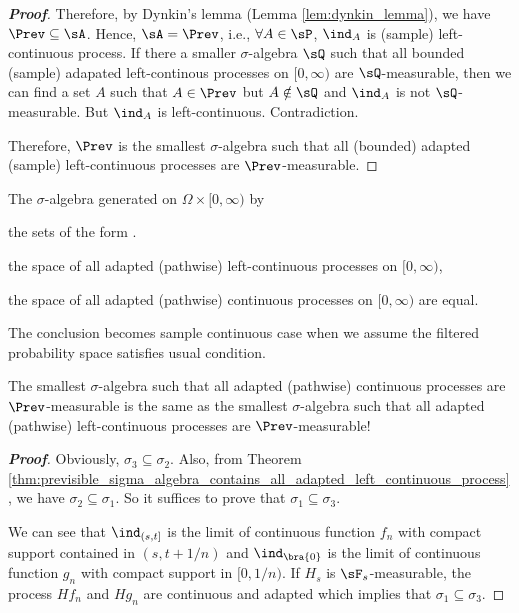 \begin{proof}[\bf Proof]
Therefore, by Dynkin's lemma (Lemma \ref{lem:dynkin_lemma}), we have $\Prev \subseteq \sA$. Hence, $\sA = \Prev$, i.e., $\forall A\in \sP$, $\ind_A$ is (sample) left-continuous process. If there a smaller $\sigma$-algebra $\sQ$ such that all bounded (sample) adapated left-continous processes on $[0,\infty)$ are $\sQ$-measurable, then we can find a set $A$ such that $A\in \Prev$ but $A\notin \sQ$ and $\ind_A$ is not $\sQ$-measurable. But $\ind_A$ is left-continuous. Contradiction.

Therefore, $\Prev$ is the smallest $\sigma$-algebra such that all (bounded) adapted (sample) left-continuous processes are $\Prev$-measurable.
\end{proof}


\begin{proposition}\label{pro:sigma_algebra_simple_process_left_continuous_continuous_equal}
The $\sigma$-algebra generated on $\Omega \times [0,\infty)$ by
\ben
\item [(i)] the sets of the form
\be
\bra{E \times(s, t]: E \in \sF_s,s < t} \cup {}.
\ee
\item [(ii)] the space of all adapted (pathwise) left-continuous processes on $[0,\infty)$,
\item [(iii)] the space of all adapted (pathwise) continuous processes on $[0,\infty)$ \een are equal.

The conclusion becomes sample continuous case when we assume the filtered probability space satisfies usual condition.
\end{proposition}

\begin{remark}
The smallest $\sigma$-algebra such that all adapted (pathwise) continuous processes are $\Prev$-measurable is the same as the smallest $\sigma$-algebra such that all adapted (pathwise) left-continuous processes are
$\Prev$-measurable!
\end{remark}

\begin{proof}[\bf Proof]
Obviously, $\sigma_3 \subseteq \sigma_2$. Also, from Theorem \ref{thm:previsible_sigma_algebra_contains_all_adapted_left_continuous_process}, we have $\sigma_2\subseteq \sigma_1$. So it suffices to prove that $\sigma_1
\subseteq \sigma_3$.

We can see that $\ind_{(s,t]}$ is the limit of continuous function $f_n$ with compact support contained in $(s,t+1/n)$ and $\ind_{\bra{0}}$ is the limit of continuous function $g_n$ with compact support in $[0,1/n)$. If $H_s$ is $\sF_s$-measurable, the process $Hf_n$ and $Hg_n$ are continuous and adapted which implies that $\sigma_1 \subseteq \sigma_3$.
\end{proof}

